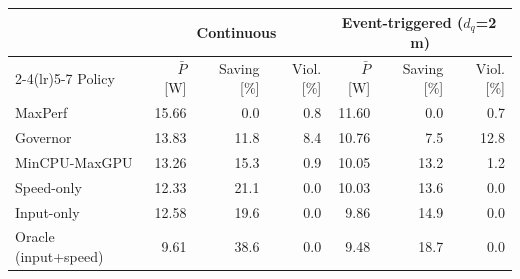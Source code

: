 \begin{tabular}{lrrrrrr}
\toprule
 & \multicolumn{3}{c}{Continuous} & \multicolumn{3}{c}{Event-triggered ($d_q$=2\,m)} \\
\cmidrule(lr){2-4}\cmidrule(lr){5-7}
Policy & $\bar P$ [W] & Saving [\%] & Viol. [\%] & $\bar P$ [W] & Saving [\%] & Viol. [\%] \\
\midrule
MaxPerf & 15.66 & 0.0 & 0.8 & 11.60 & 0.0 & 0.7 \\
Governor & 13.83 & 11.8 & 8.4 & 10.76 & 7.5 & 12.8 \\
MinCPU-MaxGPU & 13.26 & 15.3 & 0.9 & 10.05 & 13.2 & 1.2 \\
Speed-only & 12.33 & 21.1 & 0.0 & 10.03 & 13.6 & 0.0 \\
Input-only & 12.58 & 19.6 & 0.0 & 9.86 & 14.9 & 0.0 \\
\midrule
Oracle (input+speed) & 9.61 & 38.6 & 0.0 & 9.48 & 18.7 & 0.0 \\
\bottomrule
\end{tabular}
